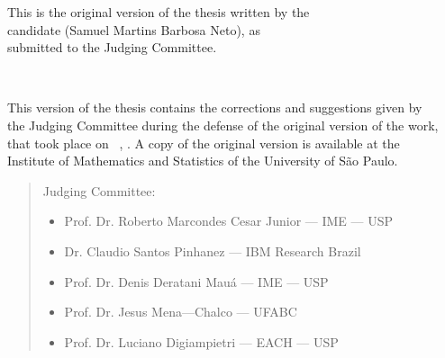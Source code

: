\documentclass[11pt,twoside,a4paper]{book}
\begin{document}
    \vskip 2cm

    \begin{flushright}
    This is the original version of the thesis written by the\\
    candidate (Samuel Martins Barbosa Neto), as\\
    submitted to the Judging Committee.
    \end{flushright}

\pagebreak


%
%
%
%
\newpage
\thispagestyle{empty}
    \begin{center}
        \vspace*{2.3 cm}
        \textbf{\Large{\phdTitle}}\\
        \vspace*{2 cm}
    \end{center}

    \vskip 2cm

    \begin{flushright}
    This version of the thesis contains the corrections and suggestions given by\\
    the Judging Committee during the defense of the original version of the work,\\
    that took place on \thesisMonth~\thesisDay, \thesisYear. A copy of the original version is available at the\\
    Institute of Mathematics and Statistics of the
University of São Paulo.

    \vskip 2cm

    \end{flushright}
    \vskip 4.2cm

    \begin{quote}
    \noindent Judging Committee:
    
    \begin{itemize}
        \item Prof. Dr. Roberto Marcondes Cesar Junior --- IME --- USP
        \item Dr. Claudio Santos Pinhanez --- IBM Research Brazil
        \item Prof. Dr. Denis Deratani Mauá --- IME --- USP
        \item Prof. Dr. Jesus Mena---Chalco --- UFABC
        \item Prof. Dr. Luciano Digiampietri --- EACH --- USP
    \end{itemize}
      
    \end{quote}
\pagebreak
\end{document}
